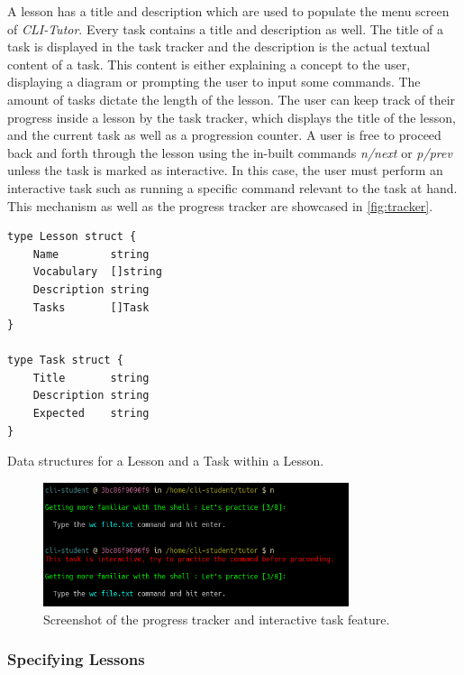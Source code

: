 A lesson has a title and description which are used to populate the menu screen
of \textit{CLI-Tutor}. Every task contains a title and description as well. The
title of a task is displayed in the task tracker and the description is the
actual textual content of a task. This content is either explaining a concept
to the user, displaying a diagram or prompting the user to input some commands.
The amount of tasks dictate the length of the lesson. The user can keep track
of their progress inside a lesson by the task tracker, which displays the title
of the lesson, and the current task as well as a progression counter. A user is free to
proceed back and forth through the lesson using the in-built commands
\textit{n/next} or \textit{p/prev} unless the task is marked as interactive. In
this case, the user must perform an interactive task such as running a specific
command relevant to the task at hand. This mechanism as well as the progress
tracker are showcased in \autoref{fig:tracker}.

\begin{listing}
    \begin{verbatim}
type Lesson struct {
    Name        string
    Vocabulary  []string
    Description string
    Tasks       []Task
}

type Task struct {
    Title       string
    Description string
    Expected    string
}
    \end{verbatim}
    \caption{Data structures for a Lesson and a Task within a Lesson.}
    \label{lst:types}
\end{listing}

\begin{figure}[htbp]
	\centering
	\includegraphics[width=0.8\textwidth]{img/tracker}
	\caption{Screenshot of the progress tracker and interactive task feature.}
	\label{fig:tracker}
\end{figure}
\clearpage

\subsubsection{Specifying Lessons}

